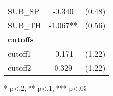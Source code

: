\begin{table}[H]
\begin{threeparttable}
\begin{tabular}{l c c}
      SUB\_SP                               & -0.340                 & (0.48)               \\
      SUB\_TH                               & -1.067**               & (0.56)               \\  
      \hline
      \textbf{cutoffs}                      &                        &                      \\
      cutoff1                               & -0.171                 & (1.22)               \\
      cutoff2                               & 0.329                  & (1.22)               \\
      \hline
      \hline
    \end{tabular}
    \begin{tablenotes}
    \item{* p<.2, ** p<.1, *** p<.05}
    \end{tablenotes}
  \end{threeparttable}
\end{table}

\clearpage{}

\newpage{}

